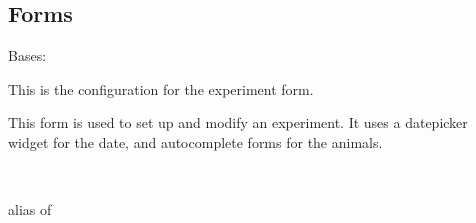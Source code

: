 \documentclass[letterpaper,10pt,english]{sphinxmanual}
\begin{document}
\subsection{Forms}
\label{api:forms}\label{api:module-data.forms}

\begin{fulllineitems}
\label{api:data.forms.ExperimentForm}
Bases: 

This is the configuration for the experiment form.

This form is used to set up and modify an experiment.  It uses a datepicker widget for the date, and autocomplete forms for the animals.

\begin{fulllineitems}
\label{api:data.forms.ExperimentForm.Media}
\end{fulllineitems}


\begin{fulllineitems}
\label{api:data.forms.ExperimentForm.Meta}~

\begin{fulllineitems}
\label{api:data.forms.ExperimentForm.Meta.model}
alias of 

\end{fulllineitems}


\end{fulllineitems}


\begin{fulllineitems}
\label{api:data.forms.ExperimentForm.media}
\end{fulllineitems}


\end{fulllineitems}
\end{document}
